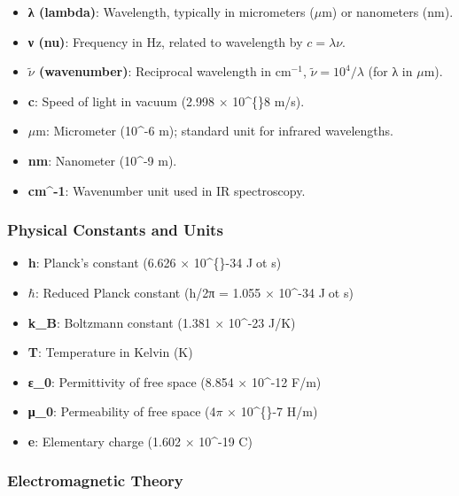 \documentclass[
  13pt,
  a4paperpaper,
  12pt]{article}
\providecommand{\tightlist}{%
  \setlength{\itemsep}{0pt}\setlength{\parskip}{0pt}}
\begin{document}
\begin{itemize}
\tightlist
\item
  \textbf{λ (lambda)}: Wavelength, typically in micrometers
  (\(\mu\mathrm{m}\)) or nanometers (nm).
\item
  \textbf{ν (nu)}: Frequency in Hz, related to wavelength by
  \(c = \lambda\nu\).
\item
  \textbf{\(\tilde{\nu}\) (wavenumber)}: Reciprocal wavelength in
  cm\(^{-1}\), \(\tilde{\nu} = 10^4/\lambda\) (for λ in
  \(\mu\mathrm{m}\)).
\item
  \textbf{c}: Speed of light in vacuum (2.998 \(\times\) 10\^{}\{\}8
  m/s).
\item
  \textbf{\(\mu\mathrm{m}\)}: Micrometer (10\^{}-6 m); standard unit for
  infrared wavelengths.
\item
  \textbf{nm}: Nanometer (10\^{}-9 m).
\item
  \textbf{cm\^{}-1}: Wavenumber unit used in IR spectroscopy.
\end{itemize}

\subsubsection{Physical Constants and
Units}\label{physical-constants-and-units}

\begin{itemize}
\tightlist
\item
  \textbf{h}: Planck's constant (6.626 \(\times\) 10\^{}\{\}-34 Jot s)
\item
  \textbf{\(\hbar\)}: Reduced Planck constant (h/2π = 1.055 \(\times\)
  10\^{}-34 Jot s)
\item
  \textbf{k\_B}: Boltzmann constant (1.381 \(\times\) 10\^{}-23 J/K)
\item
  \textbf{T}: Temperature in Kelvin (K)
\item
  \textbf{ε\_0}: Permittivity of free space (8.854 \(\times\) 10\^{}-12
  F/m)
\item
  \textbf{μ\_0}: Permeability of free space (4\(\pi\) \(\times\)
  10\^{}\{\}-7 H/m)
\item
  \textbf{e}: Elementary charge (1.602 \(\times\) 10\^{}-19 C)
\end{itemize}

\subsubsection{Electromagnetic Theory}\label{electromagnetic-theory}
\end{document}
